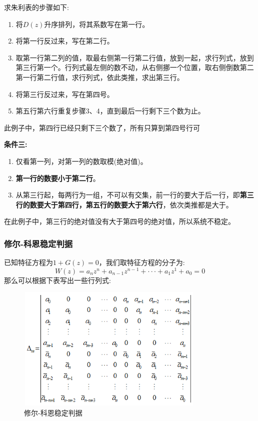 \documentclass[12pt, a4paper, oneside]{ctexbook}
\begin{document}
\noindent 求朱利表的步骤如下:
\begin{enumerate} 
	\item 将$D(z)$升序排列，将其系数写在第一行。
	\item 将第一行反过来，写在第二行。
	\item 取第一行第二列的值，取最右侧第一行第二行值，放到一起，求行列式，放到第三行第一个。行列式最左侧的数不动，从右侧挪一个位置，取右侧倒数第二第一行第二行值，求行列式，依此类推，求出第三行。
	\item 将第三行反过来，写在第四号。
	\item 第五行第六行重复步骤3、4，直到最后一行剩下三个数为止。
\end{enumerate}

\noindent 此例子中，第四行已经只剩下三个数了，所有只算到第四号行可

\noindent \textbf{条件三:}
\begin{enumerate} 
	\item 仅看第一列，对第一列的数取模(绝对值)。
	\item \textbf{第一行的数要小于第二行}。
	\item 从第三行起，每两行为一组，不可以有交集，前一行的要大于后一行，即\textbf{第三行的数要大于第四行，第五行的数要大于第六行}，依次类推都是大于。
\end{enumerate}

\noindent 在此例子中，第三行的绝对值没有大于第四号的绝对值，所以系统不稳定。
\subsubsection{修尔-科恩稳定判据} 
已知特征方程为$1+G(z)=0$，我们取特征方程的分子为:
$$W(z)=a_nz^n+a_{n-1}z^{n-1}+···+a_1z^1+a_0=0$$
那么可以根据下表写出一些行列式:
\begin{figure}[htbp]
	\centering
	\includegraphics[width=9cm,height=6cm]{img/3_4.png}
	\caption{修尔-科恩稳定判据}
\end{figure}
\end{document}
